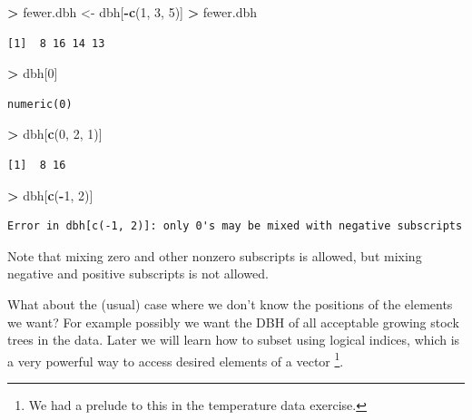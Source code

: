 \documentclass[]{krantz}
\makeatletter
\newenvironment{Shaded}{\begin{snugshade}}{\end{snugshade}}
\newcommand{\DecValTok}[1]{\textcolor[rgb]{0.06,0.06,0.06}{#1}}
\newcommand{\KeywordTok}[1]{\textcolor[rgb]{0.27,0.27,0.27}{\textbf{#1}}}
\newcommand{\NormalTok}[1]{#1}
\newcommand{\OperatorTok}[1]{\textcolor[rgb]{0.43,0.43,0.43}{\textbf{#1}}}
\newcommand{\StringTok}[1]{\textcolor[rgb]{0.5,0.5,0.5}{#1}}
\newenvironment{kframe}{%
\medskip{}
\setlength{\fboxsep}{.8em}
 \def\at@end@of@kframe{}%
 \ifinner\ifhmode%
  \def\at@end@of@kframe{\end{minipage}}%
  \begin{minipage}{\columnwidth}%
 \fi\fi%
 \def\FrameCommand##1{\hskip\@totalleftmargin \hskip-\fboxsep
 \colorbox{shadecolor}{##1}\hskip-\fboxsep
     \hskip-\linewidth \hskip-\@totalleftmargin \hskip\columnwidth}%
 \MakeFramed {\advance\hsize-\width
   \@totalleftmargin\z@ \linewidth\hsize
   \@setminipage}}%
 {\par\unskip\endMakeFramed%
 \at@end@of@kframe}
\renewenvironment{Shaded}{\begin{kframe}}{\end{kframe}}
\makeatother
\begin{document}
\begin{Shaded}
\begin{Highlighting}[]
\OperatorTok{>}\StringTok{ }\NormalTok{fewer.dbh <-}\StringTok{ }\NormalTok{dbh[}\OperatorTok{-}\KeywordTok{c}\NormalTok{(}\DecValTok{1}\NormalTok{, }\DecValTok{3}\NormalTok{, }\DecValTok{5}\NormalTok{)]}
\OperatorTok{>}\StringTok{ }\NormalTok{fewer.dbh}
\end{Highlighting}
\end{Shaded}

\begin{verbatim}
[1]  8 16 14 13
\end{verbatim}

\begin{Shaded}
\begin{Highlighting}[]
\OperatorTok{>}\StringTok{ }\NormalTok{dbh[}\DecValTok{0}\NormalTok{]}
\end{Highlighting}
\end{Shaded}

\begin{verbatim}
numeric(0)
\end{verbatim}

\begin{Shaded}
\begin{Highlighting}[]
\OperatorTok{>}\StringTok{ }\NormalTok{dbh[}\KeywordTok{c}\NormalTok{(}\DecValTok{0}\NormalTok{, }\DecValTok{2}\NormalTok{, }\DecValTok{1}\NormalTok{)]}
\end{Highlighting}
\end{Shaded}

\begin{verbatim}
[1]  8 16
\end{verbatim}

\begin{Shaded}
\begin{Highlighting}[]
\OperatorTok{>}\StringTok{ }\NormalTok{dbh[}\KeywordTok{c}\NormalTok{(}\OperatorTok{-}\DecValTok{1}\NormalTok{, }\DecValTok{2}\NormalTok{)]}
\end{Highlighting}
\end{Shaded}

\begin{verbatim}
Error in dbh[c(-1, 2)]: only 0's may be mixed with negative subscripts
\end{verbatim}

Note that mixing zero and other nonzero subscripts is allowed, but mixing negative and positive subscripts is not allowed.

What about the (usual) case where we don't know the positions of the elements we want? For example possibly we want the DBH of all acceptable growing stock trees in the data. Later we will learn how to subset using logical indices, which is a very powerful way to access desired elements of a vector \footnote{We had a prelude to this in the temperature data exercise.}.
\end{document}

